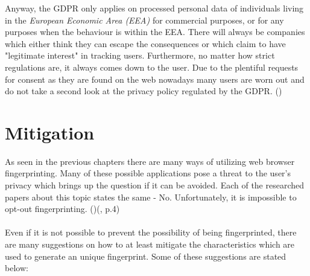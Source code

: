 Anyway, the GDPR only applies on processed personal data of individuals living in the \textit{European Economic Area (EEA)} for commercial purposes, or for any purposes when the behaviour is within the EEA. There will always be companies which either think they can escape the consequences or which claim to have "legitimate interest" in tracking users. Furthermore, no matter how strict regulations are, it always comes down to the user. Due to the plentiful requests for consent as they are found on the web nowadays many users are worn out and do not take a second look at the privacy policy regulated by the GDPR. (\textcite{miele18})

\section{Mitigation} \label{mitigation}
As seen in the previous chapters there are many ways of utilizing web browser fingerprinting. Many of these possible applications pose a threat to the user's privacy which brings up the question if it can be avoided. Each of the researched papers about this topic states the same - No. Unfortunately, it is impossible to opt-out fingerprinting. (\textcite{web17})(\textcite{upi15}, p.4)\\\\
Even if it is not possible to prevent the possibility of being fingerprinted, there are many suggestions on how to at least mitigate the characteristics which are used to generate an unique fingerprint. Some of these suggestions are stated below:
